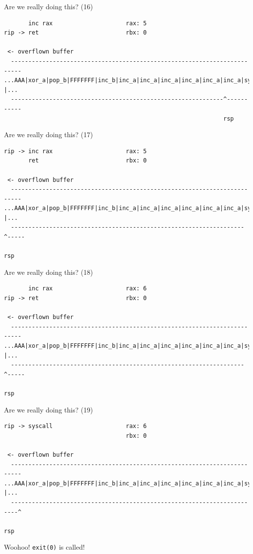 \documentclass[9pt,aspectratio=169]{beamer}
\begin{document}
\begin{frame}[label={sec:orgdc63154},fragile]{Are we really doing this? (16)}
 \begin{verbatim}
       inc rax                     rax: 5
rip -> ret                         rbx: 0

 <- overflown buffer 
  -------------------------------------------------------------------------
...AAA|xor_a|pop_b|FFFFFFF|inc_b|inc_a|inc_a|inc_a|inc_a|inc_a|inc_a|sys |...
  -------------------------------------------------------------^-----------
                                                               rsp
\end{verbatim}
\end{frame}
\begin{frame}[label={sec:org470a36e},fragile]{Are we really doing this? (17)}
 \begin{verbatim}
rip -> inc rax                     rax: 5
       ret                         rbx: 0

 <- overflown buffer 
  -------------------------------------------------------------------------
...AAA|xor_a|pop_b|FFFFFFF|inc_b|inc_a|inc_a|inc_a|inc_a|inc_a|inc_a|sys |...
  -------------------------------------------------------------------^-----
                                                                     rsp
\end{verbatim}
\end{frame}
\begin{frame}[label={sec:org02f7f1c},fragile]{Are we really doing this? (18)}
 \begin{verbatim}
       inc rax                     rax: 6
rip -> ret                         rbx: 0

 <- overflown buffer 
  -------------------------------------------------------------------------
...AAA|xor_a|pop_b|FFFFFFF|inc_b|inc_a|inc_a|inc_a|inc_a|inc_a|inc_a|sys |...
  -------------------------------------------------------------------^-----
                                                                     rsp
\end{verbatim}
\end{frame}
\begin{frame}[label={sec:org7177781},fragile]{Are we really doing this? (19)}
 \begin{verbatim}
rip -> syscall                     rax: 6
                                   rbx: 0

 <- overflown buffer 
  -------------------------------------------------------------------------
...AAA|xor_a|pop_b|FFFFFFF|inc_b|inc_a|inc_a|inc_a|inc_a|inc_a|inc_a|sys |...
  ------------------------------------------------------------------------^
                                                                          rsp
\end{verbatim}

Woohoo! \texttt{exit(0)} is called!
\end{frame}
\end{document}
